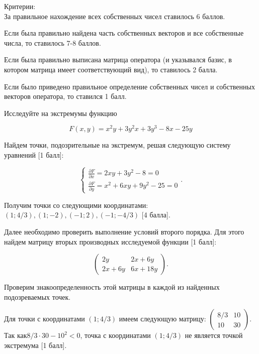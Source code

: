 \documentclass[addpoints, answers]{exam} %
\begin{document}
\begin{questions}
\begin{solution}
Критерии:\\
За правильное нахождение всех собственных чисел ставилось 6 баллов.

Если была правильно найдена часть собственных векторов и все собственные числа, то ставилось 7-8 баллов.

Если была правильно выписана матрица оператора (и указывался базис, в котором матрица имеет соответствующий вид), то ставилось 2 балла.

Если было приведено правильное определение собственных чисел и собственных векторов оператора, то ставился 1 балл.

\end{solution}

\question[10] Исследуйте на экстремумы функцию

\[
F(x,y)=x^{2} y+3y^{2} x+3y^{3} -8x-25y
\]


\begin{solution}


Найдем точки, подозрительные на экстремум, решая следующую систему уравнений $[$1 балл]:

\[\left\{\begin{array}{c} {\frac{\partial F}{\partial x} =2xy+3y^{2} -8=0} \\ {\frac{\partial F}{\partial y} =x^{2} +6xy+9y^2-25=0} \end{array}\right. .\]

Получим точки со следующими координатами: $\left(1;4/3\right),\left(1;-2\right),\left(-1;2\right),\left(-1;-4/3\right)$ $[$4 балла].

Далее необходимо проверить выполнение условий второго порядка. Для этого найдем матрицу вторых производных исследуемой функции $[$1 балл]:

\[\left(\begin{array}{cc} {2y} & {2x+6y} \\ {2x+6y} & {6x+18y} \end{array}\right).\]

Проверим знакоопределенность этой матрицы в каждой из найденных подозреваемых точек.

Для точки с координатами $\left(1;4/3\right)$ имеем следующую матрицу: $\left(\begin{array}{cc} {8/3} & {10} \\ {10} & {30} \end{array}\right)$. Так как$8/3\cdot 30-10^{2} <0$, точка с координатами $\left(1;4/3\right)$ не является точкой экстремума $[$1 балл].


\end{solution}
\end{questions}
\end{document}
